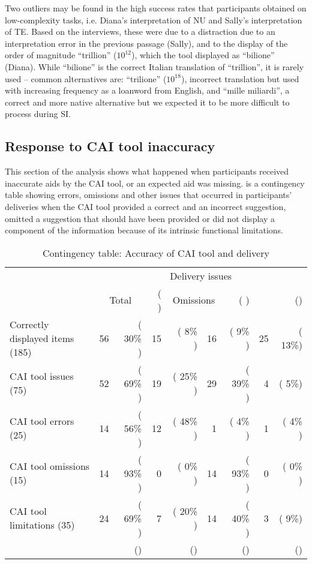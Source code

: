 Two outliers may be found in the high success rates that participants obtained on low-complexity tasks, i.e. Diana’s interpretation of NU and Sally’s interpretation of TE. Based on the interviews, these were due to a distraction due to an interpretation error in the previous passage (Sally), and to the display of the order of magnitude ``trillion'' ($10^{12}$), which the tool displayed as ``bilione'' (Diana). While ``bilione'' is the correct Italian translation of ``trillion'', it is rarely used -- common alternatives are: ``trilione'' ($10^{18}$), incorrect translation but used with increasing frequency as a loanword from English, and ``mille miliardi'', a correct and more native alternative but we expected it to be more difficult to process during SI.


\subsection{Response to CAI tool inaccuracy}

This section of the analysis shows what happened when participants received inaccurate aids by the CAI tool, or an expected aid was missing.   is a contingency table showing errors, omissions and other issues that occurred in participants’ deliveries when the CAI tool provided a correct and an incorrect suggestion, omitted a suggestion that should have been provided or did not display a component of the information because of its intrinsic functional limitations.

\begin{table}
    \begin{tabular}{l *4{r@{~}>{(}r<{)}}}
        \lsptoprule
        & \multicolumn{8}{c}{Delivery issues}\\\cmidrule(lr){2-9}
        & \multicolumn{2}{c}{Total} & \multicolumn{2}{c}{Errors} & \multicolumn{2}{c}{Omissions} & \multicolumn{2}{c}{Other}\\
        \midrule
        {Correctly displayed items (185)} & 56 & 30\% & 15 & 8\% & 16 & 9\%  & 25 & 13\%\\
        {CAI tool issues (75)} & 52 & 69\% & 19 & 25\% & 29 & 39\% & 4   & 5\%\\
        {CAI tool errors (25)} & 14 & 56\% & 12 & 48\% & 1 & 4\% & 1 & 4\% \\
        {CAI tool omissions (15)} & 14 & 93\% & 0 & 0\% & 14 & 93\% & 0 & 0\% \\
        {CAI tool limitations (35)} & 24 & 69\% & 7 & 20\% & 14 & 40\% & 3 & 9\%\\
        \lspbottomrule
    \end{tabular}
    \caption{Contingency table: Accuracy of CAI tool and delivery}
    \label{tab:15}
\end{table}

